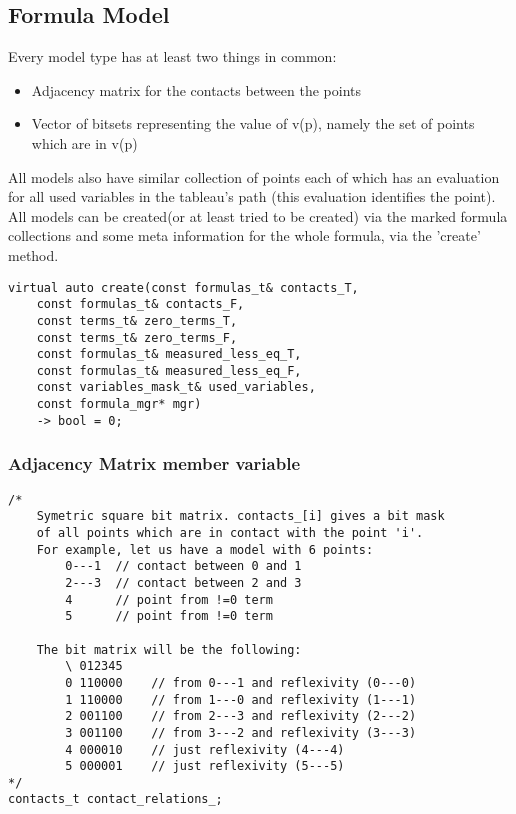 \documentclass{article}
\begin{document}
	\subsection{Formula Model}
		Every model type has at least two things in common:
		\begin{itemize}
			\item Adjacency matrix for the contacts between the points
			\item Vector of bitsets representing the value of v(p), namely the set of points which are in v(p)
		\end{itemize}

		All models also have similar collection of points each of which has an evaluation for all 
		used variables in the tableau's path (this evaluation identifies the point).
		\newline
		All models can be created(or at least tried to be created) via the marked formula collections and 
		some meta information for the whole formula, via the 'create' method.
		\begin{lstlisting}
virtual auto create(const formulas_t& contacts_T, 
	const formulas_t& contacts_F, 
	const terms_t& zero_terms_T,
	const terms_t& zero_terms_F, 
	const formulas_t& measured_less_eq_T, 
	const formulas_t& measured_less_eq_F, 
	const variables_mask_t& used_variables, 
	const formula_mgr* mgr)
    -> bool = 0;
		\end{lstlisting}

		\subsubsection*{Adjacency Matrix member variable}
			\begin{lstlisting}
/*
    Symetric square bit matrix. contacts_[i] gives a bit mask
    of all points which are in contact with the point 'i'.
    For example, let us have a model with 6 points:
        0---1  // contact between 0 and 1
        2---3  // contact between 2 and 3
        4      // point from !=0 term
        5      // point from !=0 term

    The bit matrix will be the following:
        \ 012345
        0 110000    // from 0---1 and reflexivity (0---0)
        1 110000    // from 1---0 and reflexivity (1---1)
        2 001100    // from 2---3 and reflexivity (2---2)
        3 001100    // from 3---2 and reflexivity (3---3)
        4 000010    // just reflexivity (4---4)
        5 000001    // just reflexivity (5---5)
*/
contacts_t contact_relations_;
			\end{lstlisting}
\end{document}
